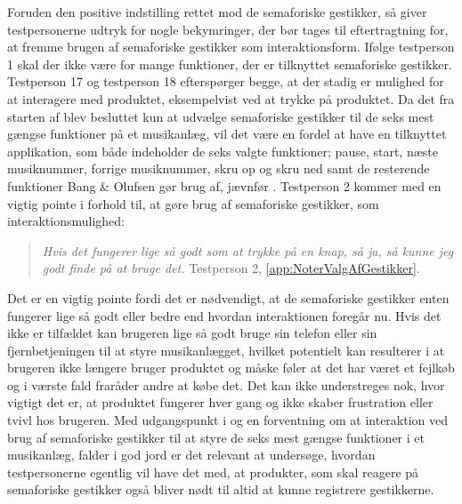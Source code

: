 Foruden den positive indstilling rettet mod de semaforiske gestikker, så giver testpersonerne udtryk for nogle bekymringer, der bør tages til eftertragtning for, at fremme brugen af semaforiske gestikker som interaktionsform. Ifølge testperson 1 skal der ikke være for mange funktioner, der er tilknyttet semaforiske gestikker. Testperson 17 og testperson 18 efterspørger begge, at der stadig er mulighed for at interagere med produktet, eksempelvist ved at trykke på produktet. Da det fra starten af blev besluttet kun at udvælge semaforiske gestikker til de seks mest gængse funktioner på et musikanlæg, vil det være en fordel at have en tilknyttet applikation, som både indeholder de seks valgte funktioner; pause, start, næste musiknummer, forrige musiknummer, skru op og skru ned samt de resterende funktioner Bang $\&$ Olufsen gør brug af, jævnfør .\blankline
% 
Testperson 2 kommer med en vigtig pointe i forhold til, at gøre brug af semaforiske gestikker, som interaktionsmulighed: 
%
\begin{quotation}
\textit{Hvis det fungerer lige så godt som at trykke på en knap, så ja, så kunne jeg godt finde på at bruge det.} Testperson 2, \autoref{app:NoterValgAfGestikker}. 
\end{quotation}
%
Det er en vigtig pointe fordi det er nødvendigt, at de semaforiske gestikker enten fungerer lige så godt eller bedre end hvordan interaktionen foregår nu. Hvis det ikke er tilfældet kan brugeren lige så godt bruge sin telefon eller sin fjernbetjeningen til at styre musikanlægget, hvilket potentielt kan resulterer i at brugeren ikke længere bruger produktet og måske føler at det har været et fejlkøb og i værste fald fraråder andre at købe det. Det kan ikke understreges nok, hvor vigtigt det er, at produktet fungerer hver gang og ikke skaber frustration eller tvivl hos brugeren. \blankline
%
Med udgangspunkt i og en forventning om at interaktion ved brug af semaforiske gestikker til at styre de seks mest gængse funktioner i et musikanlæg, falder i god jord er det relevant at undersøge, hvordan testpersonerne egentlig vil have det med, at produkter, som skal reagere på semaforiske gestikker også bliver nødt til altid at kunne registrere gestikkerne. 

  


